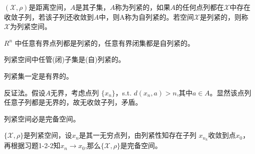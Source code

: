 \begin{definition}[自列紧与列紧]
    $(\mathscr{X},\rho)$是距离空间，$A$是其子集，$A$称为列紧的，如果$A$的任何点列都在$\mathscr{X}$中存在收敛子列，若该子列还收敛到$A$中，则A称为自列紧的。若空间$\mathscr{X}$是列紧的，则称$\mathscr{X}$为列紧空间。
\end{definition}
\begin{proposition}
    $R^n$ 中任意有界点列都是列紧的，任意有界闭集都是自列紧的。
\end{proposition}
\begin{proposition}
    列紧空间中任管(闭)子集是(自)列紧的。
\end{proposition}
\begin{proposition}
    列紧集一定是有界的。
\end{proposition}
\begin{solution}
    反证法。假设$A$无界，考虑点列 $\{x_n\}$，s.t. $d(x_n,a)>n$,其中$a\in A$。显然该点列任意子列都是无界的，故无收敛子列，矛盾。
\end{solution}
\begin{proposition}
    列紧空间必是完备空间。
\end{proposition}
\begin{solution}
    $\{\mathscr{X},\rho\}$是列紧空间，设$x_{n}$是其一无穷点列，由列紧性知存在子列
 $x_{n_k}$收敛到点$x_0$，再根据习题1-2-2知$x_n\to x_0$,那么$\{\mathscr{X},\rho\}$是完备空间。
\end{solution}

